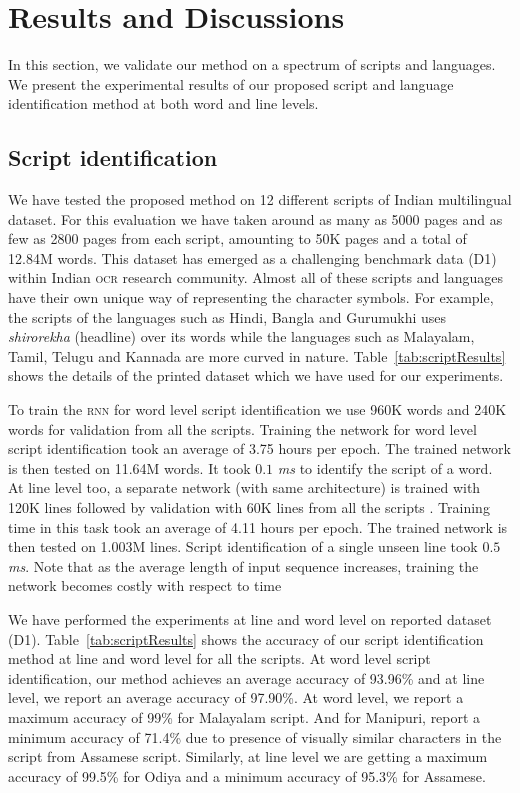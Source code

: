 \section{Results and Discussions}
\label{sec:experiments}
In this section, we validate our method on a spectrum of scripts and languages. We present the experimental results of our proposed script and language identification method at both word and line levels. 


\subsection{Script identification}
\label{subsec:scriptidentification}

We have tested the proposed method on 12 different scripts of Indian multilingual dataset. For this evaluation we have taken around as many as 5000 pages and as few as 2800 pages from each script, amounting to 50K pages and a total of 12.84M words. This dataset has emerged as a challenging benchmark data ({D1})~\cite{KumarJ07} within Indian \textsc{ocr} research community. Almost all of these scripts and languages have their own unique way of representing the character symbols. For example, the scripts of the languages such as Hindi, Bangla and Gurumukhi uses \textit{shirorekha} (headline) over its words while the languages such as Malayalam, Tamil, Telugu and Kannada are more curved in nature. %
Table~\ref{tab:scriptResults} shows the details of the printed dataset which we have used for our experiments.

To train the \textsc{rnn} for word level script identification we use 960K words and 240K words for validation from all the scripts. Training the network for word level script identification took an average of 3.75 hours per epoch. The trained network is then tested on 11.64M words. It took $\textit{0.1}$ \textit{ms} to identify the script of a word. At line level too, a separate network (with same architecture) is trained with 120K lines followed by validation with 60K lines from all the scripts . Training time in this task took an average of 4.11 hours per epoch. The trained network is then tested on 1.003M lines. Script identification of a single unseen line took $\textit{0.5}$ \textit{ms}. Note that as the average length of input sequence increases, training the network becomes costly with respect to time

We have performed the experiments at line and word level on reported dataset (D1). Table~\ref{tab:scriptResults} shows the accuracy of our script identification method at line and word level for all the scripts. At word level script identification, our method achieves an average accuracy of 93.96\% and at line level, we report an average accuracy of 97.90\%. At word level, we report a maximum accuracy of 99\% for Malayalam script. And for Manipuri, report a minimum accuracy of 71.4\% due to presence of visually similar characters in the script from Assamese script. Similarly, at line level we are getting a maximum accuracy of 99.5\% for Odiya and a minimum accuracy of 95.3\% for Assamese.  %

